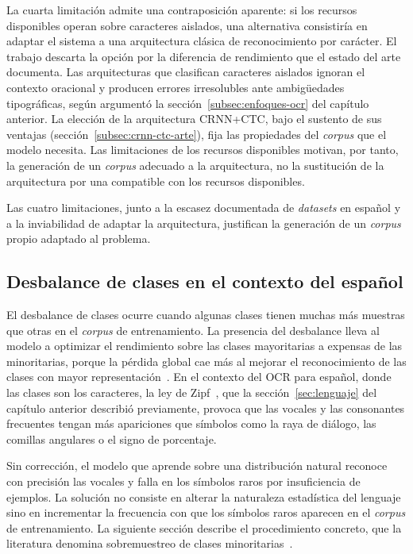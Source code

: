 La cuarta limitación admite una contraposición aparente: si los recursos disponibles operan sobre caracteres aislados, una alternativa consistiría en adaptar el sistema a una arquitectura clásica de reconocimiento por carácter. El trabajo descarta la opción por la diferencia de rendimiento que el estado del arte documenta. Las arquitecturas que clasifican caracteres aislados ignoran el contexto oracional y producen errores irresolubles ante ambigüedades tipográficas, según argumentó la sección~\ref{subsec:enfoques-ocr} del capítulo anterior. La elección de la arquitectura CRNN+CTC, bajo el sustento de sus ventajas (sección~\ref{subsec:crnn-ctc-arte}), fija las propiedades del \textit{corpus} que el modelo necesita. Las limitaciones de los recursos disponibles motivan, por tanto, la generación de un \textit{corpus} adecuado a la arquitectura, no la sustitución de la arquitectura por una compatible con los recursos disponibles.

Las cuatro limitaciones, junto a la escasez documentada de \textit{datasets} en español y a la inviabilidad de adaptar la arquitectura, justifican la generación de un \textit{corpus} propio adaptado al problema.

\subsection{Desbalance de clases en el contexto del español}
\label{subsec:desbalance}

El desbalance de clases ocurre cuando algunas clases tienen muchas más muestras que otras en el \textit{corpus} de entrenamiento. La presencia del desbalance lleva al modelo a optimizar el rendimiento sobre las clases mayoritarias a expensas de las minoritarias, porque la pérdida global cae más al mejorar el reconocimiento de las clases con mayor representación~\cite{buda2018imbalance}. En el contexto del OCR para español, donde las clases son los caracteres, la ley de Zipf~\cite{zipf1949human}, que la sección~\ref{sec:lenguaje} del capítulo anterior describió previamente, provoca que las vocales y las consonantes frecuentes tengan más apariciones que símbolos como la raya de diálogo, las comillas angulares o el signo de porcentaje.

Sin corrección, el modelo que aprende sobre una distribución natural reconoce con precisión las vocales y falla en los símbolos raros por insuficiencia de ejemplos. La solución no consiste en alterar la naturaleza estadística del lenguaje sino en incrementar la frecuencia con que los símbolos raros aparecen en el \textit{corpus} de entrenamiento. La siguiente sección describe el procedimiento concreto, que la literatura denomina sobremuestreo de clases minoritarias~\cite{chawla2002smote}.

